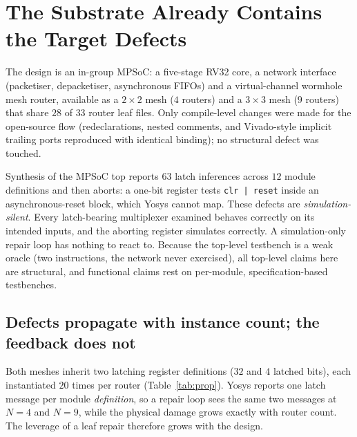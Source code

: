 \documentclass[11pt]{article}
\begin{document}
\section{The Substrate Already Contains the Target Defects}
\label{sec:substrate}

The design is an in-group MPSoC: a five-stage RV32 core, a network interface
(packetiser, depacketiser, asynchronous FIFOs) and a virtual-channel wormhole
mesh router, available as a $2{\times}2$ mesh ($4$ routers) and a $3{\times}3$
mesh ($9$ routers) that share $28$ of $33$ router leaf files. Only
compile-level changes were made for the open-source flow (redeclarations,
nested comments, and Vivado-style implicit trailing ports reproduced with
identical binding); no structural defect was touched.

Synthesis of the MPSoC top reports $63$ latch inferences across $12$ module
definitions and then aborts: a one-bit register tests \texttt{clr | reset}
inside an asynchronous-reset block, which Yosys cannot map. These defects are
\emph{simulation-silent}. Every latch-bearing multiplexer examined behaves
correctly on its intended inputs, and the aborting register simulates
correctly. A simulation-only repair loop has nothing to react to. Because the
top-level testbench is a weak oracle (two instructions, the network never
exercised), all top-level claims here are structural, and functional claims
rest on per-module, specification-based testbenches.

\subsection{Defects propagate with instance count; the feedback does not}

Both meshes inherit two latching register definitions ($32$ and $4$ latched
bits), each instantiated $20$ times per router (Table~\ref{tab:prop}). Yosys
reports one latch message per module \emph{definition}, so a repair loop sees
the same two messages at $N{=}4$ and $N{=}9$, while the physical damage grows
exactly with router count. The leverage of a leaf repair therefore grows with
the design.
\end{document}
